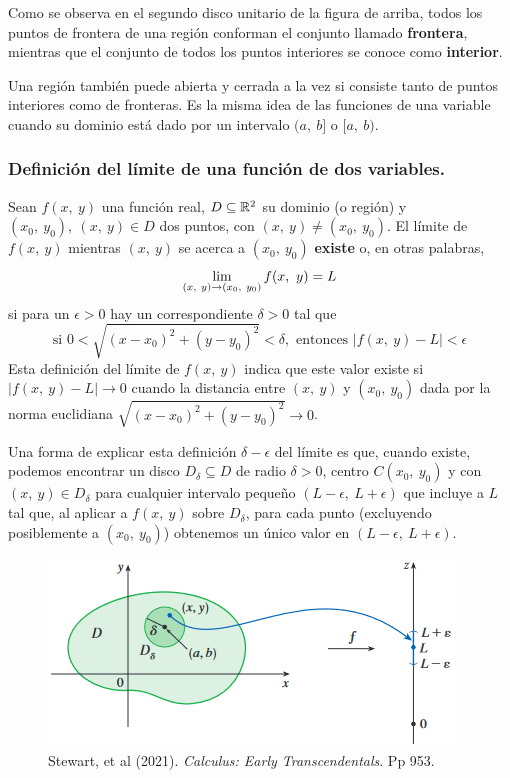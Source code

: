 \documentclass[12pt]{article}
\begin{document}
Como se observa en el segundo disco unitario de la figura de arriba, todos los puntos de frontera de una región conforman el conjunto llamado \textbf{frontera}, mientras que el conjunto de todos los puntos interiores se conoce como \textbf{interior}.

Una región también puede abierta y cerrada a la vez si consiste tanto de puntos interiores como de fronteras. Es la misma idea de las funciones de una variable cuando su dominio está dado por un intervalo $(a, \ b]$ o $[a, \ b)$.

\subsubsection{Definición del límite de una función de dos variables.}

Sean $f(x, \ y)$ una función real, $D \subseteq \mathbb{R}^{2}$ su dominio (o región) y $(x_{0}, \ y_{0}), \ (x, \ y) \in D$ dos puntos, con $(x, \ y) \neq (x_{0}, \ y_{0})$. El límite de $f(x, \ y)$ mientras $(x, \ y)$ se acerca a $(x_{0}, \ y_{0})$ \textbf{existe} o, en otras palabras,
\[
  \lim_{(x, \ y) \to (x_{0}, \ y_{0})} f(x, \ y) = L
\]
si para un $\epsilon > 0$ hay un correspondiente $\delta > 0$ tal que
\[
  \text{si } 0 < \sqrt{(x - x_{0})^{2} + (y - y_{0})^{2}} < \delta,
  \text{ entonces } |f(x, \ y) - L| < \epsilon
\]
Esta definición del límite de $f(x, \ y)$ indica que este valor existe si $|f(x, \ y) - L| \to 0$ cuando la distancia entre $(x, \ y)$ y $(x_{0}, \ y_{0})$ dada por la norma euclidiana $\sqrt{(x - x_{0})^{2} + (y - y_{0})^{2}} \to 0$.

Una forma de explicar esta definición $\delta-\epsilon$ del límite es que, cuando existe, podemos encontrar un disco $D_{\delta} \subseteq D$ de radio $\delta > 0$, centro $C(x_{0}, \ y_{0})$ y con $(x, \ y) \in D_{\delta}$ para cualquier intervalo pequeño $(L - \epsilon, \ L + \epsilon)$ que incluye a $L$ tal que, al aplicar a $f(x, \ y)$ sobre $D_{\delta}$, para cada punto (excluyendo posiblemente a $(x_{0}, \ y_{0})$) obtenemos un único valor en $(L - \epsilon, \ L + \epsilon)$.

\begin{figure}[hbt!]
\centering
\includegraphics[scale = 0.57]{limite-funcion-bivariada.png}
\caption{Stewart, et al (2021). \textit{Calculus: Early Transcendentals}. Pp 953.}
\end{figure}
\end{document}

